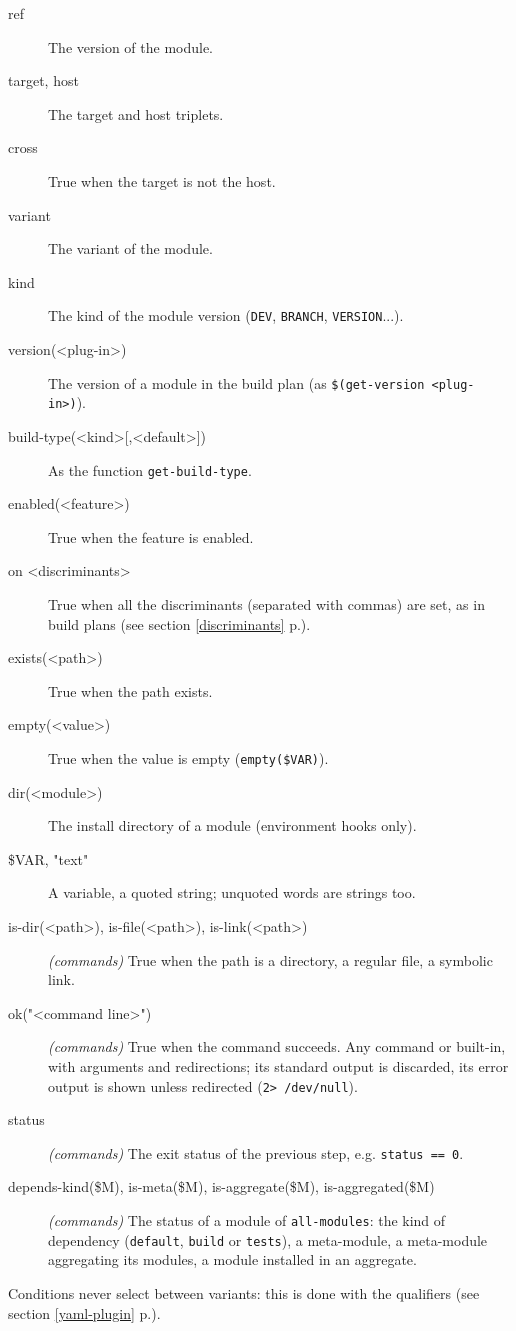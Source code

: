 \documentclass[a4paper,12pt,twoside]{article}
\newcommand{\code}[1]{\texttt{#1}}
\renewcommand{\emph}[1]{\textit{#1}}
\newcommand{\seeref}[1]{see section \ref{#1} p.\pageref{#1}}
\begin{document}
\begin{description}
	\item[ref] The version of the module.
	\item[target, host] The target and host triplets.
	\item[cross] True when the target is not the host.
	\item[variant] The variant of the module.
	\item[kind] The kind of the module version (\code{DEV}, \code{BRANCH},
	\code{VERSION}...).
	\item[version(<plug-in>)] The version of a module in the build plan (as \code{\$(get-version <plug-in>)}).
	\item[build-type(<kind>{[,<default>]})] As the function
	\code{get-build-type}.
	\item[enabled(<feature>)] True when the feature is enabled.
	\item[on <discriminants>] True when all the discriminants (separated
	with commas) are set, as in build plans (\seeref{discriminants}).
	\item[exists(<path>)] True when the path exists.
	\item[empty(<value>)] True when the value is empty
	(\code{empty(\$VAR)}).
	\item[dir(<module>)] The install directory of a module (environment
	hooks only).
	\item[\$VAR, "text"] A variable, a quoted string; unquoted words are
	strings too.
	\item[is-dir(<path>), is-file(<path>), is-link(<path>)]
	\emph{(commands)} True when the path is a directory, a regular file, a
	symbolic link.
	\item[ok("<command line>")] \emph{(commands)} True when the command
	succeeds. Any command or built-in, with arguments and redirections; its
	standard output is discarded, its error output is shown unless
	redirected (\code{2> /dev/null}).
	\item[status] \emph{(commands)} The exit status of the previous step,
	e.g. \code{status == 0}.
	\item[depends-kind(\$M), is-meta(\$M), is-aggregate(\$M), is-aggregated(\$M)]
	\emph{(commands)} The status of a module of \code{all-modules}: the
	kind of dependency (\code{default}, \code{build} or \code{tests}), a
	meta-module, a meta-module aggregating its modules, a module installed
	in an aggregate.
\end{description}

Conditions never select between variants: this is done with the
qualifiers (\seeref{yaml-plugin}).
\end{document}
